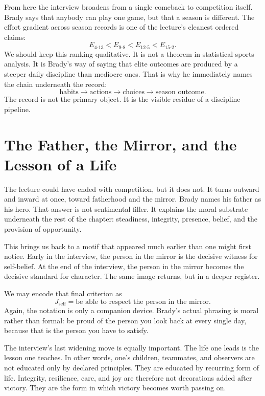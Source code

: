 From here the interview broadens from a single comeback to competition itself. Brady says that anybody can play one game, but that a season is different. The effort gradient across season records is one of the lecture's cleanest ordered claims:
\begin{equation}
E_{4\text{-}13}<E_{9\text{-}8}<E_{12\text{-}5}<E_{15\text{-}2}.
\end{equation}
We should keep this ranking qualitative. It is not a theorem in statistical sports analysis. It is Brady's way of saying that elite outcomes are produced by a steeper daily discipline than mediocre ones. That is why he immediately names the chain underneath the record:
\begin{equation}
\text{habits} \to \text{actions} \to \text{choices} \to \text{season outcome}.
\end{equation}
The record is not the primary object. It is the visible residue of a discipline pipeline.

\section{The Father, the Mirror, and the Lesson of a Life}

The lecture could have ended with competition, but it does not. It turns outward and inward at once, toward fatherhood and the mirror. Brady names his father as his hero. That answer is not sentimental filler. It explains the moral substrate underneath the rest of the chapter: steadiness, integrity, presence, belief, and the provision of opportunity.

This brings us back to a motif that appeared much earlier than one might first notice. Early in the interview, the person in the mirror is the decisive witness for self-belief. At the end of the interview, the person in the mirror becomes the decisive standard for character. The same image returns, but in a deeper register.

We may encode that final criterion as
\begin{equation}
J_{\text{self}}
=
\text{be able to respect the person in the mirror}.
\end{equation}
Again, the notation is only a companion device. Brady's actual phrasing is moral rather than formal: be proud of the person you look back at every single day, because that is the person you have to satisfy.

The interview's last widening move is equally important. The life one leads is the lesson one teaches. In other words, one's children, teammates, and observers are not educated only by declared principles. They are educated by recurring form of life. Integrity, resilience, care, and joy are therefore not decorations added after victory. They are the form in which victory becomes worth passing on.

